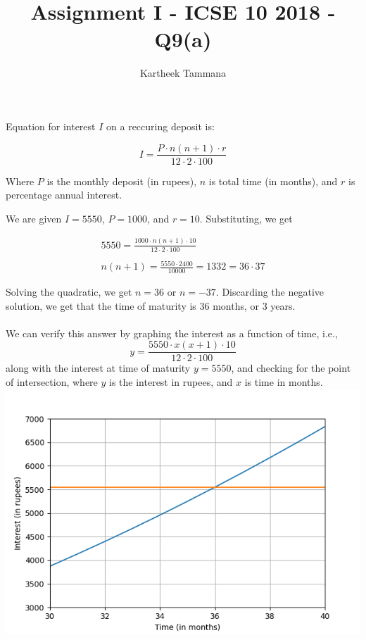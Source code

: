 \documentclass{IEEEtran}
\title{Assignment I - ICSE 10 2018 - Q9(a)}
\author{Kartheek Tammana}
\begin{document}
\maketitle

Equation for interest $I$ on a reccuring deposit is:

\begin{equation}
I = \frac{P \cdot n(n+1) \cdot r}{12 \cdot 2 \cdot 100}
\end{equation}

Where $P$ is the monthly deposit (in rupees), $n$ is total time (in months), and $r$ is percentage
annual interest.

We are given $I = 5550$, $P=1000$, and $r=10$. Substituting, we get

\begin{gather*}
    5550 = \frac{1000 \cdot n(n+1) \cdot 10}{12 \cdot 2 \cdot 100} \\ \\
    n(n+1) = \frac{5550 \cdot 2400}{10000} = 1332 = 36 \cdot 37
\end{gather*}

Solving the quadratic, we get $n=36$ or $n=-37$. Discarding the negative solution, we get that the
time of maturity is 36 months, or 3 years. \\ \\
We can verify this answer by graphing the interest as a function of time, i.e.,
\begin{equation}
y = \frac{5550 \cdot x(x+1) \cdot 10}{12 \cdot 2 \cdot 100}
\end{equation}
along with the interest at time of maturity $y=5550$, and checking for the point of intersection,
where $y$ is the interest in rupees, and $x$ is time in months.
\centering
\includegraphics[width=0.75\columnwidth]{./figs/fig.png}
\end{document}

